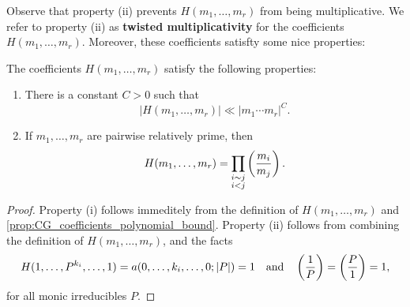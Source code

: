 \documentclass[12pt,reqno,oneside]{amsart}
\begin{document}
    Observe that property (ii) prevents $H(m_{1},\ldots,m_{r})$ from being multiplicative. We refer to property (ii) as \textbf{twisted multiplicativity} for the coefficients $H(m_{1},\ldots,m_{r})$. Moreover, these coefficients satisfty some nice properties:

    \begin{proposition}\label{prop:WMDS_coefficient_properties}
        The coefficients $H(m_{1},\ldots,m_{r})$ satisfy the following properties:
        \begin{enumerate}[label=(\roman*)]
            \item There is a constant $C > 0$ such that
            \[
                |H(m_{1},\ldots,m_{r})| \ll |m_{1} \cdots m_{r}|^{C}.
            \]
            \item If $m_{1},\ldots,m_{r}$ are pairwise relatively prime, then
            \[
                H(m_{1},\ldots,m_{r}) = \prod_{\substack{i \sim j \\ i < j}}\left(\frac{m_{i}}{m_{j}}\right).
            \]
        \end{enumerate}
    \end{proposition}
    \begin{proof}
        Property (i) follows immeditely from the definition of $H(m_{1},\ldots,m_{r})$ and \cref{prop:CG_coefficients_polynomial_bound}. Property (ii) follows from combining the definition of $H(m_{1},\ldots,m_{r})$, and the facts
        \[
            H(1,\ldots,P^{k_{i}},\ldots,1) = a(0,\ldots,k_{i},\ldots,0;|P|) = 1 \quad \text{and} \quad \left(\frac{1}{P}\right) = \left(\frac{P}{1}\right) = 1,
        \]
        for all monic irreducibles $P$. 
    \end{proof}
\end{document}
